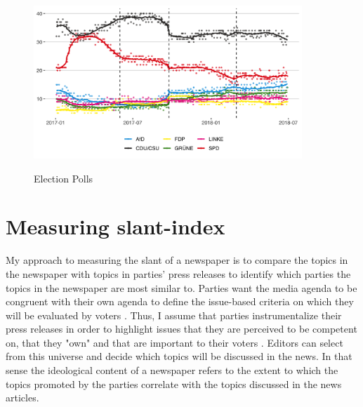 \documentclass[12pt,a4paper,notitlepage]{article}
\begin{document}
\begin{figure}[H]
\begin{center}
	\caption{Election Polls}
	\includegraphics[width=0.9\textwidth]{../figs/polldata}
	\label{fig_polls}
	\end{center}
\end{figure}

\section{Measuring slant-index}\label{ch_method}
 
My approach to measuring the slant of a newspaper is to compare the topics in the newspaper with topics in parties' press releases to identify which parties the topics in the newspaper are most similar to. Parties want the media agenda to be congruent with their own agenda to define the issue-based criteria on which they will be evaluated by voters \citep{eberl_one_2017}. Thus, I assume that parties instrumentalize their press releases in order to highlight issues that they are perceived to be competent on, that they "own" and that are important to their voters \citep{kepplinger_einfluss_2004}. Editors can select from this universe and decide which topics will be discussed in the news. In that sense the ideological content of a newspaper refers to the extent to which the topics promoted by the parties correlate with the topics discussed in the news articles.
\end{document}
